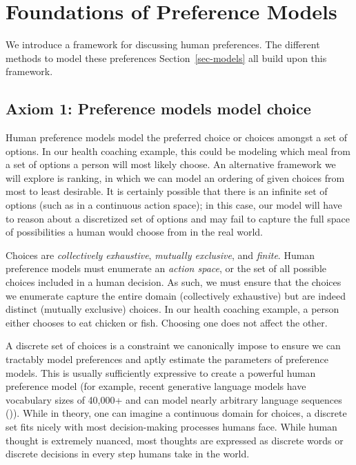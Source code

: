 \documentclass[
  letterpaper,
  numbers=noenddot,
  DIV=11,
  oneside]{scrreprt}
\theoremstyle{remark}
\begin{document}
\section{Foundations of Preference Models}\label{sec-foundations}

We introduce a framework for discussing human preferences. The different
methods to model these preferences Section~\ref{sec-models} all build
upon this framework.

\subsection*{Axiom 1: Preference models model
choice}\label{axiom-1-preference-models-model-choice}

Human preference models model the preferred choice or choices amongst a
set of options. In our health coaching example, this could be modeling
which meal from a set of options a person will most likely choose. An
alternative framework we will explore is ranking, in which we can model
an ordering of given choices from most to least desirable. It is
certainly possible that there is an infinite set of options (such as in
a continuous action space); in this case, our model will have to reason
about a discretized set of options and may fail to capture the full
space of possibilities a human would choose from in the real world.

Choices are \emph{collectively exhaustive}, \emph{mutually exclusive},
and \emph{finite}. Human preference models must enumerate an
\emph{action space}, or the set of all possible choices included in a
human decision. As such, we must ensure that the choices we enumerate
capture the entire domain (collectively exhaustive) but are indeed
distinct (mutually exclusive) choices. In our health coaching example, a
person either chooses to eat chicken or fish. Choosing one does not
affect the other.

A discrete set of choices is a constraint we canonically impose to
ensure we can tractably model preferences and aptly estimate the
parameters of preference models. This is usually sufficiently expressive
to create a powerful human preference model (for example, recent
generative language models have vocabulary sizes of 40,000+ and can
model nearly arbitrary language sequences
()). While in theory,
one can imagine a continuous domain for choices, a discrete set fits
nicely with most decision-making processes humans face. While human
thought is extremely nuanced, most thoughts are expressed as discrete
words or discrete decisions in every step humans take in the world.
\end{document}
